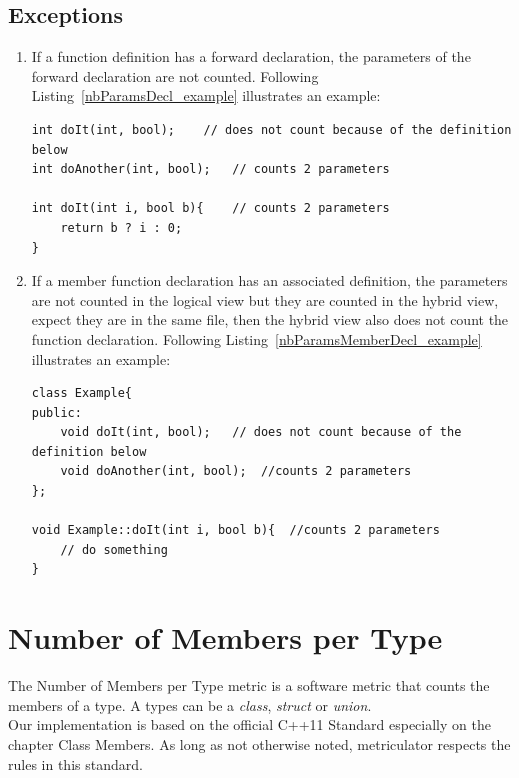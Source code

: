 \documentclass[11pt,a4paper,oneside]{scrreprt}
\begin{document}
\subsection{Exceptions}
\begin{enumerate}
\item If a function definition has a forward declaration, the parameters of the forward declaration are not counted. Following Listing~\ref{nbParamsDecl_example} illustrates an example:
\begin{lstlisting}[style=C++0x, caption=Code snippet for Number of Parameters per Function - function declarations and definitions, label=nbParamsDecl_example]
int doIt(int, bool);	// does not count because of the definition below
int doAnother(int, bool);	// counts 2 parameters

int doIt(int i, bool b){	// counts 2 parameters
	return b ? i : 0;
}
\end{lstlisting}

\item If a member function declaration has an associated definition, the parameters are not counted in the logical view but they are counted in the hybrid view, expect they are in the same file, then the hybrid view also does not count the function declaration. Following Listing~\ref{nbParamsMemberDecl_example} illustrates an example:
\begin{lstlisting}[style=C++0x, caption=Code snippet for Number of Parameters per Function - member function declarations and definitions, label=nbParamsMemberDecl_example]
class Example{
public:
	void doIt(int, bool);	// does not count because of the definition below
	void doAnother(int, bool);	//counts 2 parameters
};

void Example::doIt(int i, bool b){	//counts 2 parameters
	// do something
}
\end{lstlisting}
\end{enumerate}

\section{Number of Members per Type}\label{nbmembers}
The Number of Members per Type metric is a software metric that counts the members of a type. A types can be a \textit{class}, \textit{struct} or \textit{union}. \\
Our implementation is based on the official C++11 Standard \cite{cpp_11_std} especially on the chapter Class Members. As long as not otherwise noted, metriculator respects the rules in this standard.
\end{document}

